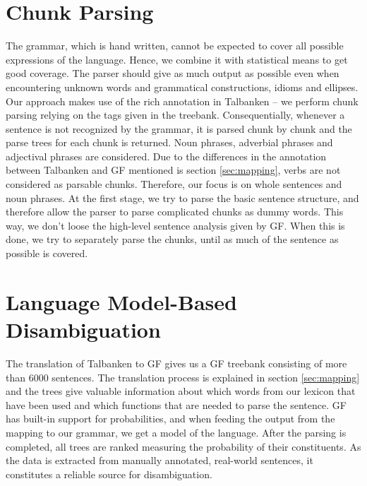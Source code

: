 \documentclass[runningheads,a4paper]{llncs}
\begin{document}
\section{Chunk Parsing}
\label{sec:chunk}
The grammar, which is hand written, cannot be expected to cover all
possible expressions of the language.
Hence, we combine it with statistical means to get good coverage. 
The parser should give as much output as possible 
even when encountering unknown words and grammatical constructions,
idioms and ellipses.
Our approach makes use of the rich annotation in Talbanken -- we perform chunk parsing
relying on the tags given in the treebank. 
Consequentially, whenever a sentence is not recognized by the grammar, it is 
parsed chunk by chunk and the parse trees for each chunk is returned.
Noun phrases, adverbial phrases and adjectival phrases are considered.
Due to the differences in the annotation between Talbanken and
GF mentioned is section \ref{sec:mapping}, verbs are not considered
as parsable chunks. %
Therefore, our focus is on whole sentences and noun phrases. At the first stage,
we try to parse the basic sentence structure, and therefore allow the parser
to parse complicated chunks as dummy words. This way, we don't loose the 
high-level sentence analysis given by GF.
When this is done, we try to separately parse the chunks,
until as much of the sentence as possible is covered. 



\section{Language Model-Based Disambiguation}

The translation of Talbanken to GF gives us a GF treebank consisting of more than
6000 sentences. The translation process is explained in section
\ref{sec:mapping} and the trees give valuable 
information about which words from our lexicon that have been used
and which functions that are needed to parse the sentence.
GF has built-in support for probabilities, and when feeding the output
from the mapping to our grammar, we get a model of the language. 
After the parsing is completed, all trees are ranked measuring the
probability of their constituents.
As the data is extracted from manually annotated, real-world sentences,
it constitutes a reliable source for disambiguation.
\end{document}
